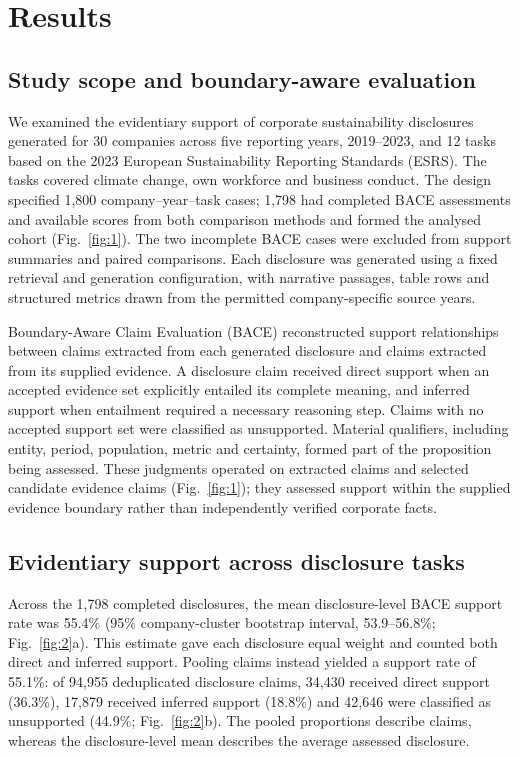 \documentclass[11pt,a4paper]{article}
\begin{document}
\section*{Results}

\subsection*{Study scope and boundary-aware evaluation}

We examined the evidentiary support of corporate sustainability disclosures generated for 30 companies across five reporting years, 2019--2023, and 12 tasks based on the 2023 European Sustainability Reporting Standards (ESRS). The tasks covered climate change, own workforce and business conduct. The design specified 1,800 company--year--task cases; 1,798 had completed BACE assessments and available scores from both comparison methods and formed the analysed cohort (Fig.~\ref{fig:1}). The two incomplete BACE cases were excluded from support summaries and paired comparisons. Each disclosure was generated using a fixed retrieval and generation configuration, with narrative passages, table rows and structured metrics drawn from the permitted company-specific source years.

Boundary-Aware Claim Evaluation (BACE) reconstructed support relationships between claims extracted from each generated disclosure and claims extracted from its supplied evidence. A disclosure claim received direct support when an accepted evidence set explicitly entailed its complete meaning, and inferred support when entailment required a necessary reasoning step. Claims with no accepted support set were classified as unsupported. Material qualifiers, including entity, period, population, metric and certainty, formed part of the proposition being assessed. These judgments operated on extracted claims and selected candidate evidence claims (Fig.~\ref{fig:1}); they assessed support within the supplied evidence boundary rather than independently verified corporate facts.

\subsection*{Evidentiary support across disclosure tasks}

Across the 1,798 completed disclosures, the mean disclosure-level BACE support rate was 55.4\% (95\% company-cluster bootstrap interval, 53.9--56.8\%; Fig.~\ref{fig:2}a). This estimate gave each disclosure equal weight and counted both direct and inferred support. Pooling claims instead yielded a support rate of 55.1\%: of 94,955 deduplicated disclosure claims, 34,430 received direct support (36.3\%), 17,879 received inferred support (18.8\%) and 42,646 were classified as unsupported (44.9\%; Fig.~\ref{fig:2}b). The pooled proportions describe claims, whereas the disclosure-level mean describes the average assessed disclosure.
\end{document}
